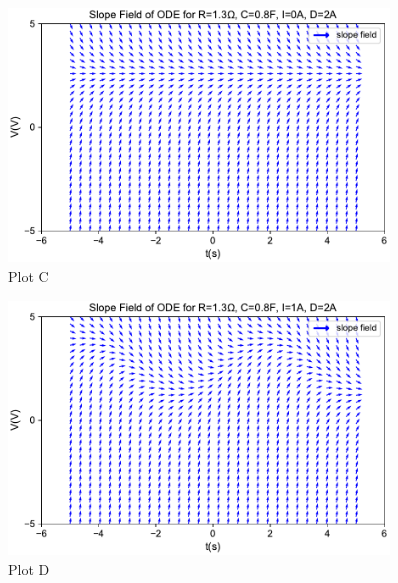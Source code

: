 \documentclass{scrartcl}
\begin{document}
\begin{figure}[h]
	\centering
	\includegraphics[width=0.9\textwidth]{figures/ode_3_i0_d2.pdf}
	\caption{Plot C}
\end{figure}

\begin{figure}[h]
	\centering
	\includegraphics[width=0.9\textwidth]{figures/ode_3_i1_d2.pdf}
	\caption{Plot D}
\end{figure}
\end{document}

